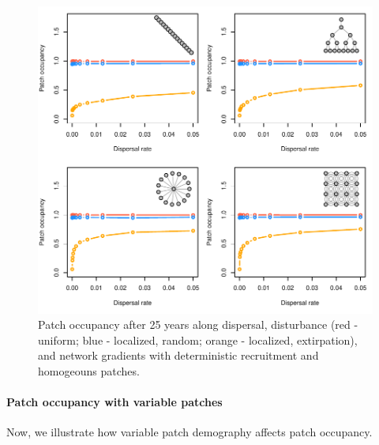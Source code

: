 \documentclass[
]{article}
\begin{document}
\begin{figure}[H]

{\centering \includegraphics{Managing_for_ecological_surprises_in_metapopulations_files/figure-latex/patch occupancy-1} 

}

\caption{Patch occupancy after 25 years along dispersal, disturbance (red - uniform; blue - localized, random; orange - localized, extirpation), and network gradients with deterministic recruitment and homogeouns patches.}\label{fig:patch occupancy}
\end{figure}
\newpage

\hypertarget{patch-occupancy-with-variable-patches}{%
\paragraph{Patch occupancy with variable
patches}\label{patch-occupancy-with-variable-patches}}

Now, we illustrate how variable patch demography affects patch
occupancy.
\end{document}

